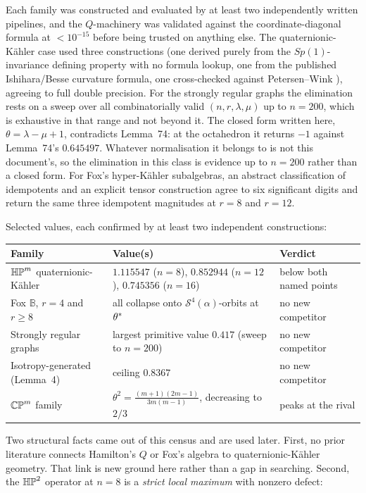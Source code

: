 \begin{certificate}
Each family was constructed and evaluated by at least two independently written pipelines, and the $Q$-machinery was validated against the coordinate-diagonal formula at $<10^{-15}$ before being trusted on anything else. The quaternionic-K\"ahler case used three constructions (one derived purely from the $Sp(1)$-invariance defining property with no formula lookup, one from the published Ishihara/Besse curvature formula, one cross-checked against Petersen--Wink \cite{pw2021}), agreeing to full double precision. For the strongly regular graphs the elimination rests on a sweep over all combinatorially valid $(n,r,\lambda,\mu)$ up to $n=200$, which is exhaustive in that range and not beyond it. The closed form written here, $\theta=\lambda-\mu+1$, contradicts Lemma~74: at the octahedron it returns $-1$ against Lemma~74's $0.645497$. Whatever normalisation it belongs to is not this document's, so the elimination in this class is evidence up to $n=200$ rather than a closed form. For Fox's hyper-K\"ahler subalgebras, an abstract classification of idempotents and an explicit tensor construction agree to six significant digits and return the same three idempotent magnitudes at $r=8$ and $r=12$.
\end{certificate}

Selected values, each confirmed by at least two independent constructions:
\begin{center}
\begin{tabular}{@{}lll@{}}
\toprule
Family & Value(s) & Verdict \\
\midrule
$\mathbb{HP}^m$ quaternionic-K\"ahler & $1.115547$ ($n{=}8$), $0.852944$ ($n{=}12$), $0.745356$ ($n{=}16$) & below both named points \\
Fox $\mathbb B$, $r=4$ and $r\ge8$ & all collapse onto $\mathcal S^4(\alpha)$-orbits at $\theta^{*}$ & no new competitor \\
Strongly regular graphs & largest primitive value $0.417$ (sweep to $n=200$) & no new competitor \\
Isotropy-generated (Lemma~4) & ceiling $0.8367$ & no new competitor \\
$\mathbb{CP}^m$ family & $\theta^2=\tfrac{(m+1)(2m-1)}{3m(m-1)}$, decreasing to $2/3$ & peaks at the rival \\
\bottomrule
\end{tabular}
\end{center}

Two structural facts came out of this census and are used later. First, no prior literature connects Hamilton's $Q$ or Fox's algebra to quaternionic-K\"ahler geometry. That link is new ground here rather than a gap in searching. Second, the $\mathbb{HP}^2$ operator at $n=8$ is a \emph{strict local maximum} with nonzero defect:

